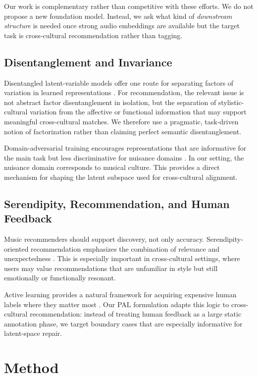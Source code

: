 \documentclass[10pt,twocolumn]{article}
\begin{document}
Our work is complementary rather than competitive with these efforts.
We do not propose a new foundation model.
Instead, we ask what kind of \emph{downstream structure} is needed once strong audio embeddings are available but the target task is cross-cultural recommendation rather than tagging.

\subsection{Disentanglement and Invariance}
Disentangled latent-variable models offer one route for separating factors of variation in learned representations \citep{higgins2017betavae,kim2018factorvae}.
For recommendation, the relevant issue is not abstract factor disentanglement in isolation, but the separation of stylistic-cultural variation from the affective or functional information that may support meaningful cross-cultural matches.
We therefore use a pragmatic, task-driven notion of factorization rather than claiming perfect semantic disentanglement.

Domain-adversarial training encourages representations that are informative for the main task but less discriminative for nuisance domains \citep{ganin2016dann}.
In our setting, the nuisance domain corresponds to musical culture.
This provides a direct mechanism for shaping the latent subspace used for cross-cultural alignment.

\subsection{Serendipity, Recommendation, and Human Feedback}
Music recommenders should support discovery, not only accuracy.
Serendipity-oriented recommendation emphasizes the combination of relevance and unexpectedness \citep{zhang2012auralist}.
This is especially important in cross-cultural settings, where users may value recommendations that are unfamiliar in style but still emotionally or functionally resonant.

Active learning provides a natural framework for acquiring expensive human labels where they matter most \citep{settles2009active}.
Our PAL formulation adapts this logic to cross-cultural recommendation:
instead of treating human feedback as a large static annotation phase, we target boundary cases that are especially informative for latent-space repair.

\section{Method}
\end{document}
